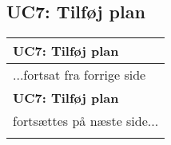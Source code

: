 \subsection{UC7: Tilføj plan}

\begin{center} \centering
	\begin{longtable}{|p{6cm}|p{8cm}|}
	\hline
		\multicolumn{2}{|l|}{\textbf{UC7: Tilføj plan}} \\\hline
		\endfirsthead
		
		\multicolumn{2}{l}{...fortsat fra forrige side} \\ \hline 
		\multicolumn{2}{|l|}{\textbf{UC7: Tilføj plan}} \\\hline
		\endhead		

        \multicolumn{2}{r}{fortsættes på næste side...} \\
        \endfoot
        \endlastfoot
        

\end{longtable}
\end{center}
